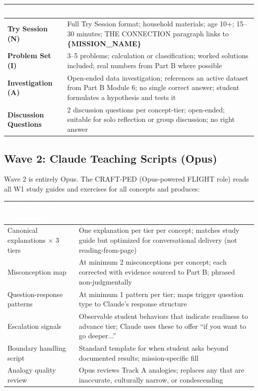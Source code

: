 \documentclass[11pt,letterpaper]{article}
\newcommand{\param}[1]{\textcolor{paramred}{\textbf{\{#1\}}}}
\newcommand{\tableheader}[1]{\textbf{\sffamily\textcolor{white}{#1}}}
\begin{document}
\begin{center}
\begin{tabularx}{\textwidth}{L{3cm}X}
\toprule
{}
\tableheader{Material Type} & \tableheader{Requirements} \\
\midrule
\textcolor{novice}{\textbf{Try Session (N)}} & Full Try Session format; household materials; age 10+; 15--30 minutes; THE CONNECTION paragraph links to \param{MISSION\_NAME} \\
\textcolor{intermediate}{\textbf{Problem Set (I)}} & 3--5 problems; calculation or classification; worked solutions included; real numbers from Part B where possible \\
\textcolor{advanced}{\textbf{Investigation (A)}} & Open-ended data investigation; references an active dataset from Part B Module 6; no single correct answer; student formulates a hypothesis and tests it \\
\textcolor{novice}{\textcolor{intermediate}{\textcolor{advanced}{\textbf{Discussion Questions}}}} & 2 discussion questions per concept-tier; open-ended; suitable for solo reflection or group discussion; no right answer \\
\bottomrule
\end{tabularx}
\end{center}

\subsection{Wave 2: Claude Teaching Scripts (Opus)}

Wave 2 is entirely Opus. The CRAFT-PED (Opus-powered FLIGHT role) reads all W1 study guides and exercises for all concepts and produces:

\begin{center}
\begin{tabularx}{\textwidth}{L{4cm}X}
\toprule
{}
\tableheader{Teaching Script Component} & \tableheader{Description} \\
\midrule
Canonical explanations $\times$ 3 tiers & One explanation per tier per concept; matches study guide but optimized for conversational delivery (not reading-from-page) \\
Misconception map & At minimum 2 misconceptions per concept; each corrected with evidence sourced to Part B; phrased non-judgmentally \\
Question-response patterns & At minimum 1 pattern per tier; maps trigger question type to Claude's response structure \\
Escalation signals & Observable student behaviors that indicate readiness to advance tier; Claude uses these to offer ``if you want to go deeper...'' \\
Boundary handling script & Standard template for when student asks beyond documented results; mission-specific fill \\
Analogy quality review & Opus reviews Track A analogies; replaces any that are inaccurate, culturally narrow, or condescending \\
\bottomrule
\end{tabularx}
\end{center}
\end{document}
